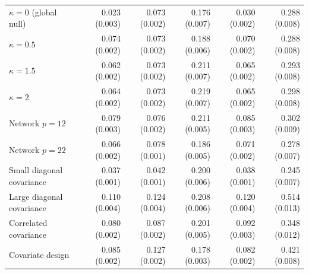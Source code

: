 \begin{table}[htbp]
{\begin{tabular}{lrrrrr}
$\kappa=0$ (global null) & 0.023 (0.003) & 0.073 (0.002) & 0.176 (0.007) & 0.030 (0.002) & 0.288 (0.008)\\ 
$\kappa=0.5$ & 0.074 (0.002) & 0.073 (0.002) & 0.188 (0.006) & 0.070 (0.002) & 0.288 (0.008)\\ 
$\kappa=1.5$ & 0.062 (0.002) & 0.073 (0.002) & 0.211 (0.007) & 0.065 (0.002) & 0.293 (0.008)\\ 
$\kappa=2$ & 0.064 (0.002) & 0.073 (0.002) & 0.219 (0.007) & 0.065 (0.002) & 0.298 (0.008)\\ 
Network $p=12$ & 0.079 (0.003) & 0.076 (0.002) & 0.211 (0.005) & 0.085 (0.003) & 0.302 (0.009)\\ 
Network $p=22$ & 0.066 (0.002) & 0.078 (0.001) & 0.186 (0.005) & 0.071 (0.002) & 0.278 (0.007)\\ 
Small diagonal covariance & 0.037 (0.001) & 0.042 (0.001) & 0.200 (0.006) & 0.038 (0.001) & 0.245 (0.007)\\ 
Large diagonal covariance & 0.110 (0.004) & 0.124 (0.004) & 0.208 (0.006) & 0.120 (0.004) & 0.514 (0.013)\\ 
Correlated covariance & 0.080 (0.002) & 0.087 (0.002) & 0.201 (0.005) & 0.092 (0.003) & 0.348 (0.012)\\ 
Covariate design & 0.085 (0.002) & 0.127 (0.002) & 0.178 (0.003) & 0.082 (0.002) & 0.421 (0.008)\\ 
\bottomrule
\end{tabular}
}
\end{table}
 
